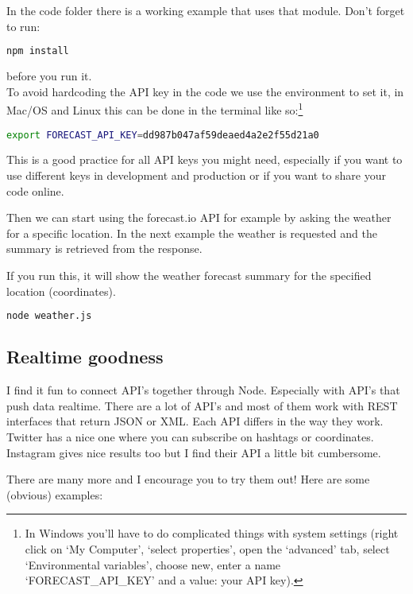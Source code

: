 \documentclass[a4paper]{report}
\begin{document}
In the code folder there is a working example that uses that module. Don't forget to run:

\begin{lstlisting}[language=bash]
npm install
\end{lstlisting}

\noindent before you run it.
\\
\noindent To avoid hardcoding the API key in the code we use the environment to set it, in Mac/OS and Linux this can be done in the terminal like so:\footnote{In Windows you'll have to do complicated things with system settings (right click on `My Computer', `select properties', open the `advanced' tab, select `Environmental variables', choose new, enter a name `FORECAST\_API\_KEY' and a value: your API key).}
\begin{lstlisting}[language=bash]
export FORECAST_API_KEY=dd987b047af59deaed4a2e2f55d21a0
\end{lstlisting}

\noindent This is a good practice for all API keys you might need, especially if you want to use different keys in development and production or if you want to share your code online.

\noindent Then we can start using the forecast.io API for example by asking the weather for a specific location. In the next example the weather is requested and the summary is retrieved from the response.



\noindent If you run this, it will show the weather forecast summary for the specified location (coordinates).

\begin{lstlisting}[language=bash]
node weather.js
\end{lstlisting}

\subsection*{Realtime goodness}
I find it fun to connect API's together through Node. Especially with API's that push data realtime. There are a lot of API's and most of them work with REST interfaces that return JSON or XML. Each API differs in the way they work. Twitter has a nice one where you can subscribe on hashtags or coordinates. Instagram gives nice results too but I find their API a little bit cumbersome. 

There are many more and I encourage you to try them out! Here are some (obvious) examples:
\end{document}
